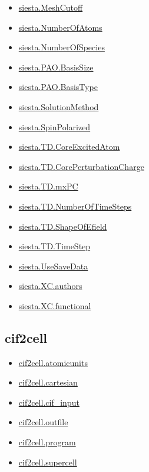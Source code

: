 \documentclass[11pt]{article}
\begin{document}
\begin{itemize}
\item \hyperref[kw:siesta-MeshCutoff]{siesta.MeshCutoff}
\item \hyperref[kw:siesta-NumberOfAtoms]{siesta.NumberOfAtoms}
\item \hyperref[kw:siesta-NumberOfSpecies]{siesta.NumberOfSpecies}
\item \hyperref[kw:siesta-PAO-BasisSize]{siesta.PAO.BasisSize}
\item \hyperref[kw:siesta-PAO-BasisType]{siesta.PAO.BasisType}
\item \hyperref[kw:siesta-SolutionMethod]{siesta.SolutionMethod}
\item \hyperref[kw:siesta-SpinPolarized]{siesta.SpinPolarized}
\item \hyperref[kw:siesta-TD-CoreExcitedAtom]{siesta.TD.CoreExcitedAtom}
\item \hyperref[kw:siesta-TD-CorePerturbationCharge]{siesta.TD.CorePerturbationCharge}
\item \hyperref[kw:siesta-TD-mxPC]{siesta.TD.mxPC}
\item \hyperref[kw:siesta-TD-NumberOfTimeSteps]{siesta.TD.NumberOfTimeSteps}
\item \hyperref[kw:siesta-TD-ShapeOfEfield]{siesta.TD.ShapeOfEfield}
\item \hyperref[kw:siesta-TD-TimeStep]{siesta.TD.TimeStep}
\item \hyperref[kw:siesta-UseSaveData]{siesta.UseSaveData}
\item \hyperref[kw:siesta-XC-authors]{siesta.XC.authors}
\item \hyperref[kw:siesta-XC-functional]{siesta.XC.functional}
\end{itemize}

\subsection*{cif2cell}
\begin{itemize}
\item \hyperref[kw:cif2cell-atomicunits]{cif2cell.atomicunits}
\item \hyperref[kw:cif2cell-cartesian]{cif2cell.cartesian}
\item \hyperref[kw:cif2cell-cif-input]{cif2cell.cif\_input}
\item \hyperref[kw:cif2cell-outfile]{cif2cell.outfile}
\item \hyperref[kw:cif2cell-program]{cif2cell.program}
\item \hyperref[kw:cif2cell-supercell]{cif2cell.supercell}
\end{itemize}
\end{document}
